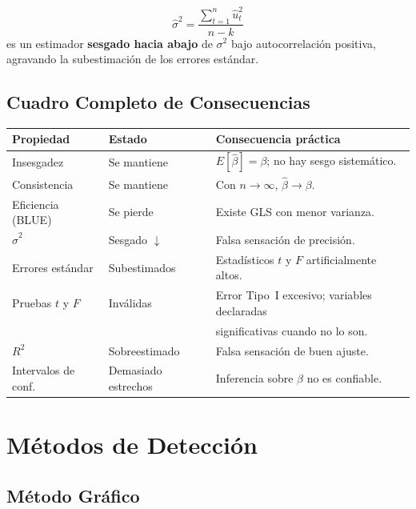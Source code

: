 \documentclass[11pt, letterpaper]{article}
\begin{document}
\[
  \hat\sigma^2 = \frac{\sum_{t=1}^n \hat{u}_t^2}{n-k}
\]
es un estimador \textbf{sesgado hacia abajo} de $\sigma^2$ bajo
autocorrelaci\'on positiva, agravando la subestimaci\'on de los errores
est\'andar.

\subsection{Cuadro Completo de Consecuencias}

\begin{center}
{\small
\begin{tabular}{llp{6.5cm}}
\toprule
\textbf{Propiedad} & \textbf{Estado} & \textbf{Consecuencia pr\'actica}\\
\midrule
Insesgadez           & Se mantiene &
  $E[\hat\beta]=\beta$; no hay sesgo sistem\'atico.\\
Consistencia         & Se mantiene &
  Con $n\to\infty$, $\hat\beta\to\beta$.\\
Eficiencia (BLUE)    & Se pierde   &
  Existe GLS con menor varianza.\\
$\hat\sigma^2$       & Sesgado $\downarrow$ &
  Falsa sensaci\'on de precisi\'on.\\
Errores est\'andar    & Subestimados &
  Estad\'isticos $t$ y $F$ artificialmente altos.\\
Pruebas $t$ y $F$    & Inv\'alidas  &
  Error Tipo~I excesivo; variables declaradas\\
                     &             &
  significativas cuando no lo son.\\
$R^2$                & Sobreestimado &
  Falsa sensaci\'on de buen ajuste.\\
Intervalos de conf.  & Demasiado estrechos &
  Inferencia sobre $\beta$ no es confiable.\\
\bottomrule
\end{tabular}
}
\end{center}

\section{M\'etodos de Detecci\'on}

\subsection{M\'etodo Gr\'afico}
\end{document}
